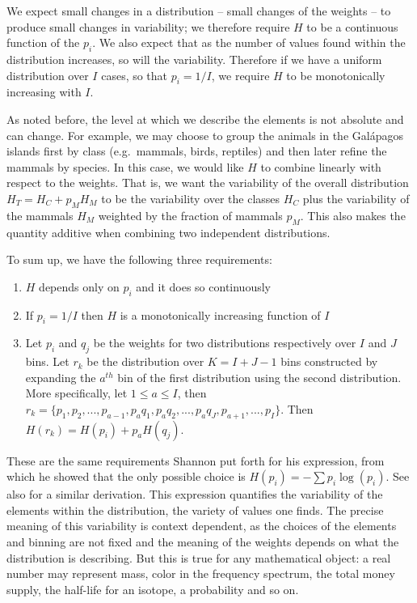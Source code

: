 \documentclass[iopart]{revtex4-1}
\begin{document}
We  expect small changes in a distribution -- small changes of the weights -- to produce small changes in variability; we therefore require $H$ to be a continuous function of the $p_i$. We also expect that as the number of values found within the distribution increases, so will the variability. Therefore if we have a uniform distribution over $I$ cases, so that $p_i = 1/I$, we require $H$ to be monotonically increasing with $I$.

As noted before, the level at which we describe the elements is not absolute and can change. For example, we may choose to group the animals in the Gal\'{a}pagos islands first by class (e.g.~mammals, birds, reptiles) and then later refine the mammals by species. In this case, we would like $H$ to combine linearly with respect to the weights. That is, we want the variability of the overall distribution $H_T = H_C + p_M H_M$ to be the variability over the classes $H_C$ plus the variability of the mammals $H_M$ weighted by the fraction of mammals $p_M$. This also makes the quantity additive when combining two independent distributions.

To sum up, we have the following three requirements:
\begin{enumerate}
\item $H$ depends only on $p_i$ and it does so continuously
\item If $p_i=1/I$ then $H$ is a monotonically increasing function of $I$
\item Let $p_i$ and $q_j$ be the weights for two distributions respectively over $I$ and $J$ bins. Let $r_k$ be the distribution over $K=I+J-1$ bins constructed by expanding the $a^{th}$ bin of the first distribution using the second distribution. More specifically, let $1 \leq a \leq I$, then $r_k = \{p_1, p_2, ..., p_{a-1}, p_{a}q_1, p_{a}q_2, ..., p_{a}q_J, p_{a+1}, ..., p_I \}$. Then $H(r_k) = H(p_i) + p_{a} H(q_j)$.
\end{enumerate}
These are the same requirements Shannon put forth for his expression\cite{Shannon}, from which he showed that the only possible choice is $H(p_i) = - \sum p_i \log(p_i)$. See also \cite{khinchin2013mathematical} for a similar derivation. This expression quantifies the variability of the elements within the distribution, the variety of values one finds. The precise meaning of this variability is context dependent, as the choices of the elements and binning are not fixed and the meaning of the weights depends on what the distribution is describing. But this is true for any mathematical object: a real number may represent mass, color in the frequency spectrum, the total money supply, the half-life for an isotope, a probability and so on.
\end{document}
